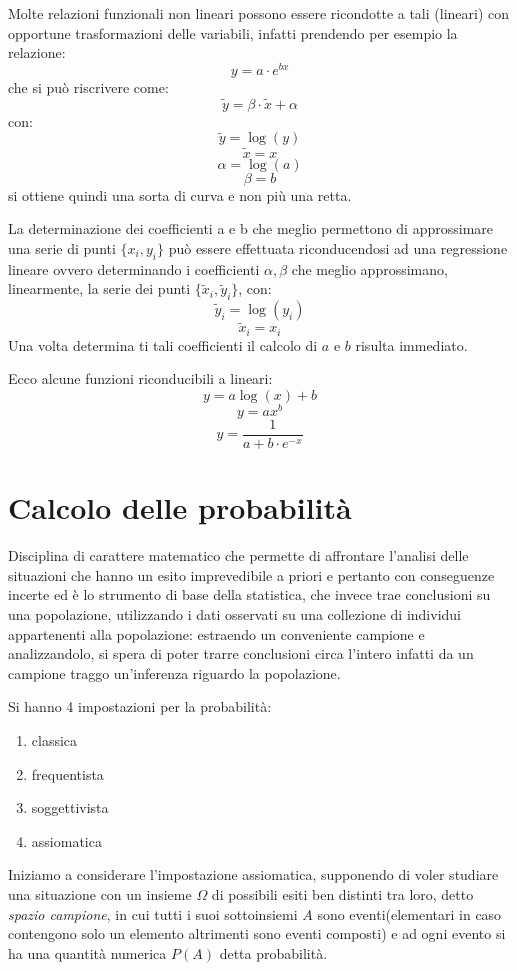 \documentclass[a4paper,12pt, oneside]{book}
\begin{document}
Molte relazioni funzionali non lineari possono essere ricondotte a tali (lineari) con opportune trasformazioni delle variabili,
infatti prendendo per esempio la relazione:
\[ y = a\cdot e^{bx} \]
che si può riscrivere come:
\[ \widetilde{y} = \beta\cdot \widetilde{x}+\alpha \]
con: 
\[ \widetilde{y}=\log(y) \]
\[ \widetilde{x}=x \]
\[ \alpha=\log(a) \]
\[ \beta = b \]
si ottiene quindi una sorta di curva e non più una retta.

La determinazione dei coefficienti a e b che meglio permettono di approssimare una serie di punti $\{x_i,y_i\}$ 
può essere effettuata riconducendosi ad una regressione lineare ovvero determinando i coefficienti $\alpha,\beta$ 
che meglio approssimano, linearmente, la serie dei punti $\{\widetilde{x}_i,\widetilde{y}_i\}$, con:
\[ \widetilde{y}_i = \log(y_i) \]
\[ \widetilde{x}_i = x_i \]
Una volta determina ti tali coefficienti il calcolo di $a$ e $b$ risulta immediato. 

Ecco alcune funzioni riconducibili a lineari:
\[ y = a \log(x) + b \]
\[ y=ax^b \]
\[ y=\frac{1}{a+b\cdot e^{-x}} \]

\chapter{Calcolo delle probabilità}
Disciplina di carattere matematico che permette di affrontare l'analisi delle situazioni che hanno un esito imprevedibile
a priori e pertanto con conseguenze incerte ed è lo strumento di base della statistica, che invece trae conclusioni
su una popolazione, utilizzando i dati osservati su una collezione di individui appartenenti alla popolazione:
estraendo un conveniente campione e analizzandolo, si spera di poter trarre conclusioni circa l'intero infatti 
da un campione traggo un'inferenza riguardo la popolazione.

Si hanno 4 impostazioni per la probabilità:
\begin{enumerate}
    \item classica
    \item frequentista
    \item soggettivista
    \item assiomatica
\end{enumerate}
Iniziamo a considerare l'impostazione assiomatica, supponendo di voler studiare una situazione con un insieme $\Omega$
di possibili esiti ben distinti tra loro, detto \emph{spazio campione}, in cui tutti i suoi sottoinsiemi
$A$ sono eventi(elementari in caso contengono solo un elemento altrimenti sono eventi composti)
e ad ogni evento si ha una quantità numerica $P(A)$ detta probabilità.
\end{document}
